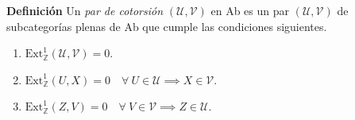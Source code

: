 \documentclass[preview]{standalone}
\begin{document}
\begin{center}
\justifying \textbf{Definición} Un \emph{par de cotorsión} $(\mathcal{U}, \mathcal{V})$ en Ab es un par $(\mathcal{U}, \mathcal{V})$ de subcategorías plenas de Ab que cumple las condiciones siguientes.\begin{enumerate} \item $\text{Ext}^1_\mathbb{Z} (\mathcal{U}, \mathcal{V}) = 0$.\item $\text{Ext}^1_\mathbb{Z} (U, X) = 0 \quad \forall \ U\in\mathcal{U} \implies X\in\mathcal{V}$.\item $\text{Ext}^1_\mathbb{Z} (Z, V) = 0 \quad \forall \ V\in\mathcal{V} \implies Z\in\mathcal{U}$. \end{enumerate}
\end{center}
\end{document}
